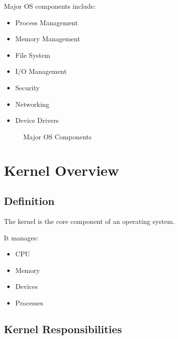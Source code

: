 Major OS components include:

\begin{itemize}
\item Process Management
\item Memory Management
\item File System
\item I/O Management
\item Security
\item Networking
\item Device Drivers
\end{itemize}

\begin{figure}[H]
\centering
{}
\caption{Major OS Components}
\end{figure}

\section{Kernel Overview}

\subsection{Definition}

The kernel is the core component of an operating system.

It manages:

\begin{itemize}
\item CPU
\item Memory
\item Devices
\item Processes
\end{itemize}

\subsection{Kernel Responsibilities}

